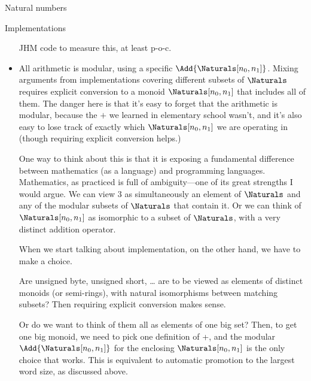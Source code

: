 \documentclass[12pt]{PalisadesLakesBook}
\begin{document}
\begin{plSection}{Natural numbers}
\begin{plSection}{Implementations}
\begin{itemize}
  \TODO JHM code to measure this, at least p-o-c.
  
  \item All arithmetic is modular, 
  using a specific $\Add{\Naturals[n_0,n_1]}$.
  Mixing arguments from implementations covering different subsets
  of $\Naturals$ requires explicit conversion to a monoid
  $\Naturals[n_0,n_1]$ that includes all of them.
  The danger here is that it's easy to forget that the arithmetic
  is modular, because the $+$ we learned in elementary school
  wasn't, and it's also easy to lose track of exactly which
  $\Naturals[n_0,n_1]$ we are operating in 
  (though requiring explicit conversion helps.)
  
  One way to think about this is that it is exposing a fundamental
  difference between mathematics (as a language) and programming
  languages. 
  Mathematics, as practiced is full of ambiguity---one 
  of its great strengths I would argue.
  We can view $3$ as simultaneously an element of $\Naturals$
  and any of the modular subsets of $\Naturals$ that contain it.
  Or we can think of $\Naturals[n_0,n_1]$ as isomorphic to 
  a subset of $\Naturals$, with a very distinct addition operator.
  
  When we start talking about implementation, on the other hand,
  we have to make a choice. 
  
  Are {\javaFont unsigned byte},
  {\javaFont unsigned short}, {\ldots} are to be viewed as
  elements of distinct monoids (or semi-rings),
  with natural isomorphisms between matching subsets?
  Then requiring explicit conversion makes sense.
  
  Or do we want to think of them all as elements of one big set?
  Then, to get one big monoid, we need to pick one definition
  of {\javaFont +}, and the modular $\Add{\Naturals[n_0,n_1]}$
  for the enclosing $\Naturals[n_0,n_1]$ 
  is the only choice that works.
  This is equivalent to automatic promotion to the largest 
  word size, as discussed above.
  
\end{itemize}

\end{plSection}%
\end{plSection}%
\end{document}
